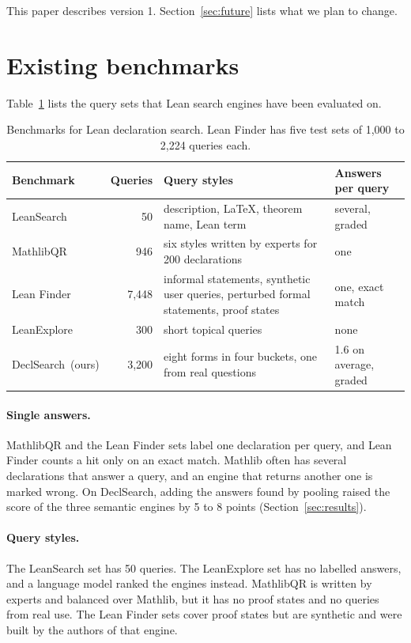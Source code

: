 \documentclass{article}
\newcommand{\thead}[1]{\textbf{#1}}
\newcommand{\rowrule}{\arrayrulecolor{nBorderLight}\specialrule{0.4pt}{3pt}{3pt}\arrayrulecolor{nBorder}}
\newcommand{\bench}{DeclSearch}
\begin{document}
This paper describes version 1. Section~\ref{sec:future} lists what we plan to
change.

\section{Existing benchmarks}
\label{sec:existing}

Table~\ref{tab:existing} lists the query sets that Lean search engines have
been evaluated on.

\begin{table}[t]
\centering\small
\caption{Benchmarks for Lean declaration search. Lean Finder has five test
sets of 1,000 to 2,224 queries each.}
\label{tab:existing}
\begin{tabularx}{\linewidth}{@{}lrXl@{}}
\toprule
\thead{Benchmark} & \thead{Queries} & \thead{Query styles} & \thead{Answers per query} \\
\midrule
LeanSearch~\cite{gao2024leansearch} & 50 & description, \LaTeX, theorem name, Lean term & several, graded \\
\rowrule
MathlibQR~\cite{gao2026leansearchv2} & 946 & six styles written by experts for 200 declarations & one \\
\rowrule
Lean Finder~\cite{lu2025leanfinder} & 7,448 & informal statements, synthetic user queries, perturbed formal statements, proof states & one, exact match \\
\rowrule
LeanExplore~\cite{asher2025leanexplore} & 300 & short topical queries & none \\
\rowrule
\bench\ (ours) & 3,200 & eight forms in four buckets, one from real questions & 1.6 on average, graded \\
\bottomrule
\end{tabularx}
\end{table}

\paragraph{Single answers.} MathlibQR and the Lean Finder sets label one
declaration per query, and Lean Finder counts a hit only on an exact match.
Mathlib often has several declarations that answer a query, and an engine that
returns another one is marked wrong. On \bench, adding the answers found
by pooling raised the score of the three semantic engines by 5 to 8 points
(Section~\ref{sec:results}).

\paragraph{Query styles.} The LeanSearch set has 50 queries. The LeanExplore
set has no labelled answers, and a language model ranked the engines instead.
MathlibQR is written by experts and balanced over Mathlib, but it has no proof
states and no queries from real use. The Lean Finder sets cover proof states
but are synthetic and were built by the authors of that engine.
\end{document}
